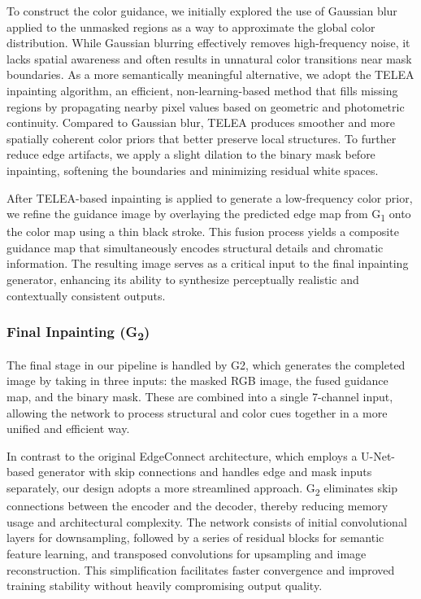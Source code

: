 To construct the color guidance, we initially explored the use of Gaussian blur applied to the unmasked regions as a way to approximate the global color distribution. While Gaussian blurring effectively removes high-frequency noise, it lacks spatial awareness and often results in unnatural color transitions near mask boundaries. As a more semantically meaningful alternative, we adopt the TELEA inpainting algorithm, an efficient, non-learning-based method that fills missing regions by propagating nearby pixel values based on geometric and photometric continuity. Compared to Gaussian blur, TELEA produces smoother and more spatially coherent color priors that better preserve local structures. To further reduce edge artifacts, we apply a slight dilation to the binary mask before inpainting, softening the boundaries and minimizing residual white spaces.

After TELEA-based inpainting is applied to generate a low-frequency color prior, we refine the guidance image by overlaying the predicted edge map from G\textsubscript{1} onto the color map using a thin black stroke. This fusion process yields a composite guidance map that simultaneously encodes structural details and chromatic information. The resulting image serves as a critical input to the final inpainting generator, enhancing its ability to synthesize perceptually realistic and contextually consistent outputs.


\subsubsection{Final Inpainting (G\textsubscript{2})}

The final stage in our pipeline is handled by G2, which generates the completed image by taking in three inputs: the masked RGB image, the fused guidance map, and the binary mask. These are combined into a single 7-channel input, allowing the network to process structural and color cues together in a more unified and efficient way.

In contrast to the original EdgeConnect architecture, which employs a U-Net-based generator with skip connections and handles edge and mask inputs separately, our design adopts a more streamlined approach. G\textsubscript{2} eliminates skip connections between the encoder and the decoder, thereby reducing memory usage and architectural complexity. The network consists of initial convolutional layers for downsampling, followed by a series of residual blocks for semantic feature learning, and transposed convolutions for upsampling and image reconstruction. This simplification facilitates faster convergence and improved training stability without heavily compromising output quality.

